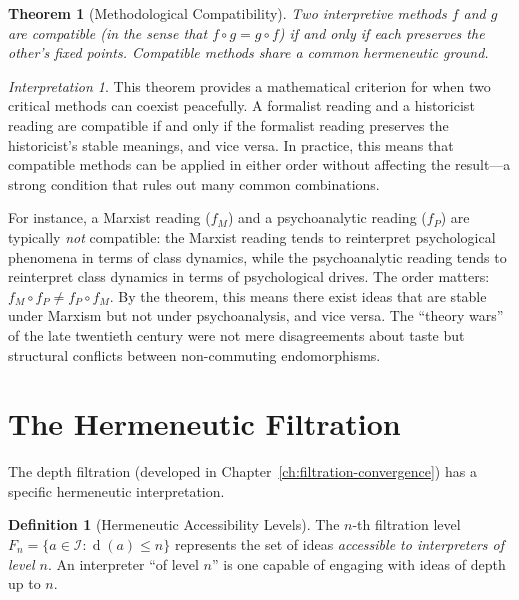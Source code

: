 \documentclass[11pt,openany]{book}
\theoremstyle{definition}
\newtheorem{definition}[axiom]{Definition}
\theoremstyle{plain}
\newtheorem{theorem}[axiom]{Theorem}
\theoremstyle{remark}
\newtheorem{interpretation}[axiom]{Interpretation}
\newcommand{\IS}{\mathcal{I}}               %
\newcommand{\depth}{\operatorname{d}}       %
\begin{document}
\begin{theorem}[Methodological Compatibility]
Two interpretive methods $f$ and $g$ are \emph{compatible} (in the sense that $f \circ g = g \circ f$) if and only if each preserves the other's fixed points. Compatible methods share a common hermeneutic ground.
\end{theorem}

\begin{interpretation}
This theorem provides a mathematical criterion for when two critical methods can coexist peacefully. A formalist reading and a historicist reading are compatible if and only if the formalist reading preserves the historicist's stable meanings, and vice versa. In practice, this means that compatible methods can be applied in either order without affecting the result---a strong condition that rules out many common combinations.

For instance, a Marxist reading ($f_M$) and a psychoanalytic reading ($f_P$) are typically \emph{not} compatible: the Marxist reading tends to reinterpret psychological phenomena in terms of class dynamics, while the psychoanalytic reading tends to reinterpret class dynamics in terms of psychological drives. The order matters: $f_M \circ f_P \neq f_P \circ f_M$. By the theorem, this means there exist ideas that are stable under Marxism but not under psychoanalysis, and vice versa. The ``theory wars'' of the late twentieth century were not mere disagreements about taste but structural conflicts between non-commuting endomorphisms.
\end{interpretation}

\section{The Hermeneutic Filtration}

The depth filtration (developed in Chapter~\ref{ch:filtration-convergence}) has a specific hermeneutic interpretation.

\begin{definition}[Hermeneutic Accessibility Levels]
The $n$-th filtration level $F_n = \{a \in \IS : \depth(a) \leq n\}$ represents the set of ideas \emph{accessible to interpreters of level $n$}. An interpreter ``of level $n$'' is one capable of engaging with ideas of depth up to $n$.
\end{definition}
\end{document}
